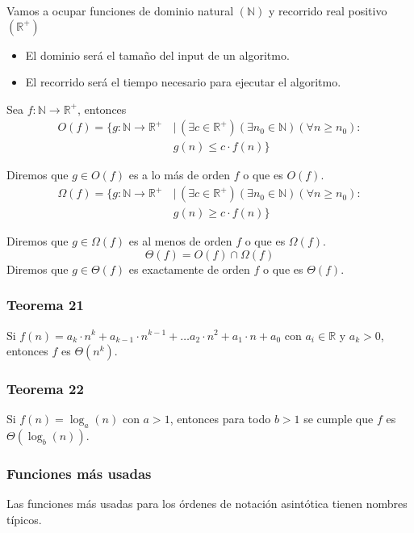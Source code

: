 \begin{multicols}{2}
    Vamos a ocupar funciones de dominio natural $(\mathbb{N})$ y recorrido real positivo $(\mathbb{R}^+)$
    \begin{itemize}
        \item El dominio será el tamaño del input de un algoritmo.
        \item El recorrido será el tiempo necesario para ejecutar el algoritmo.
    \end{itemize}
    Sea $f: \mathbb{N} \rightarrow \mathbb{R}^+$, entonces
    \begin{align*}
        O(f) = \{ g: \mathbb{N} \rightarrow \mathbb{R}^+ \,&|\, ( \exists c \in \mathbb{R}^+ ) ( \exists n_0 \in \mathbb{N} ) ( \forall n \geq n_0 ): \\
        &g(n) \leq c \cdot f(n) \}
    \end{align*}
    
    Diremos que $g \in O(f)$ es a lo más de orden $f$ o que es $O(f)$.
    \begin{align*}
        \Omega(f) = \{ g: \mathbb{N} \rightarrow \mathbb{R}^+ \,&|\, ( \exists c \in \mathbb{R}^+ ) ( \exists n_0 \in \mathbb{N} ) ( \forall n \geq n_0 ): \\
        &g(n) \geq c \cdot f(n) \}
    \end{align*}
    
    Diremos que $g \in \Omega(f)$ es al menos de orden $f$ o que es $\Omega(f)$.
    $$
    \Theta(f) = O(f) \cap \Omega(f)
    $$
    Diremos que $g \in \Theta(f)$ es exactamente de orden $f$ o que es $\Theta(f)$.
    
    \subsubsection*{Teorema 21}
    Si $f(n) = a_k \cdot n^k + a_{k - 1} \cdot n^{k - 1} + \ldots a_2 \cdot n^2 + a_1 \cdot n + a_0$ con $a_i \in \mathbb{R}$ y $a_k > 0$, entonces $f$ es $\Theta(n^k)$.
    
    \subsubsection*{Teorema 22}
    Si $f(n) = \log_a(n)$ con $a > 1$, entonces para todo $b > 1$ se cumple que $f$ es $\Theta(\log_b(n))$.
    
    \subsubsection*{Funciones más usadas}
    Las funciones más usadas para los órdenes de notación asintótica tienen nombres típicos.
    

\end{multicols}
